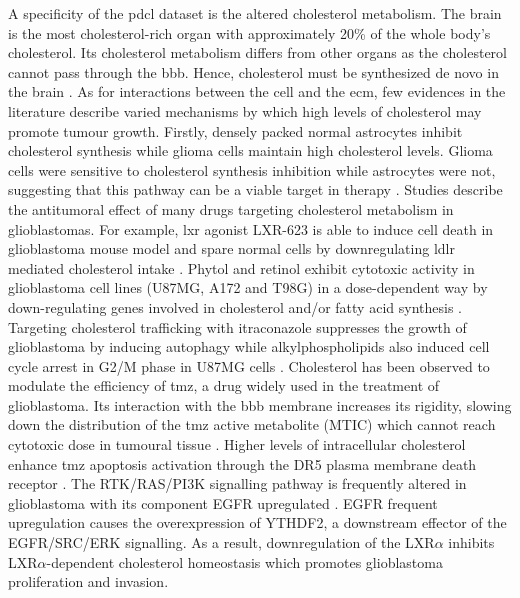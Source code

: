 A specificity of the \acrshort{pdcl} dataset is the altered cholesterol metabolism.
The brain is the most cholesterol-rich organ with approximately 20\% of the whole body's cholesterol.
Its cholesterol metabolism differs from other organs as the cholesterol cannot pass through the \acrfull{bbb}.
Hence, cholesterol must be synthesized de novo in the brain \cite*{Villa2016,Yamamoto2018,Pirmoradi2019}.
As for interactions between the cell and the \acrlong{ecm}, few evidences in the literature describe varied mechanisms by which high levels of cholesterol may promote tumour growth.
Firstly, densely packed normal astrocytes inhibit cholesterol synthesis while glioma cells maintain high cholesterol levels.
Glioma cells were sensitive to cholesterol synthesis inhibition while astrocytes were not, suggesting that this pathway can be a viable target in therapy \cite*{Kambach2017}.
Studies describe the antitumoral effect of many drugs targeting cholesterol metabolism in glioblastomas.
For example, \acrfull{lxr} agonist LXR-623 is able to induce cell death in glioblastoma mouse model and spare normal cells by downregulating \acrfull{ldlr} mediated cholesterol intake \cite*{Villa2016, Pirmoradi2019}.
Phytol and retinol exhibit cytotoxic activity in glioblastoma cell lines (U87MG, A172 and T98G) in a dose-dependent way by down-regulating genes involved in cholesterol and/or fatty acid synthesis \cite*{Facchini2018}.
Targeting cholesterol trafficking with itraconazole suppresses the growth of glioblastoma by inducing autophagy \cite*{Liu2014} while alkylphospholipids also induced cell cycle arrest in G2/M phase in U87MG cells \cite*{Rios-Marco2013}.
Cholesterol has been observed to modulate the efficiency of \acrfull{tmz}, a drug widely used in the treatment of glioblastoma.
Its interaction with the \acrshort{bbb} membrane increases its rigidity, slowing down the distribution of the \acrshort{tmz} active metabolite (MTIC) which cannot reach cytotoxic dose in tumoural tissue \cite*{Ramalho2019}.
Higher levels of intracellular cholesterol enhance \acrshort{tmz} apoptosis activation through the DR5 plasma membrane death receptor \cite*{Yamamoto2018}.
The RTK/RAS/PI3K signalling pathway is frequently altered in glioblastoma with its component EGFR upregulated \cite*{McLendon2008}.
EGFR frequent upregulation causes the overexpression of YTHDF2, a downstream effector of the EGFR/SRC/ERK signalling.
As a result, downregulation of the LXR$\alpha$ inhibits LXR$\alpha$-dependent cholesterol homeostasis which promotes glioblastoma proliferation and invasion.

